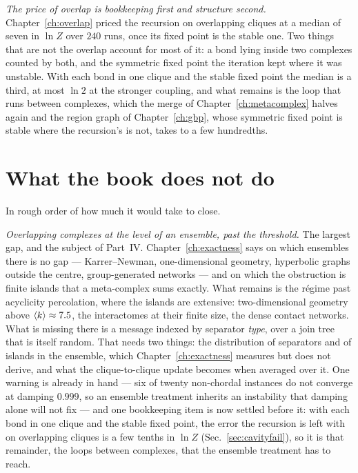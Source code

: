 \emph{The price of overlap is bookkeeping first and structure second.}
Chapter~\ref{ch:overlap} priced the recursion on overlapping cliques at a
median of seven in $\ln Z$ over $240$ runs, once its fixed point is the
stable one. Two things that are not the overlap account for most of it: a
bond lying inside two complexes counted by both, and the symmetric fixed
point the iteration kept where it was unstable. With each bond in one
clique and the stable fixed point the median is a third, at most $\ln2$ at
the stronger coupling, and what remains is the loop that runs between
complexes, which the merge of Chapter~\ref{ch:metacomplex} halves again
and the region graph of Chapter~\ref{ch:gbp}, whose symmetric fixed point
is stable where the recursion's is not, takes to a few hundredths.

\section{What the book does not do}
\label{sec:notdone}

In rough order of how much it would take to close.

\emph{Overlapping complexes at the level of an ensemble, past the
threshold.} The largest gap, and the subject of Part~IV.
Chapter~\ref{ch:exactness} says on which ensembles there is no gap ---
Karrer--Newman, one-dimensional geometry, hyperbolic graphs outside the
centre, group-generated networks --- and on which the obstruction is finite
islands that a meta-complex sums exactly. What remains is the r\'egime past
acyclicity percolation, where the islands are extensive: two-dimensional
geometry above $\langle k \rangle\approx7.5$, the interactomes at their finite size,
the dense contact networks. What is missing there is a message indexed by
separator \emph{type}, over a join tree that is itself random. That needs
two things: the distribution of separators and of islands in the ensemble,
which Chapter~\ref{ch:exactness} measures but does not derive, and what the
clique-to-clique update becomes when averaged over it. One warning is
already in hand --- six of twenty non-chordal instances do not converge at
damping $0.999$, so an ensemble treatment inherits an instability that
damping alone will not fix --- and one bookkeeping item is now settled
before it: with each bond in one clique and the stable fixed point, the
error the recursion is left with on overlapping cliques is a few tenths in
$\ln Z$ (Sec.~\ref{sec:cavityfail}), so it is that remainder, the loops
between complexes, that the ensemble treatment has to reach.

